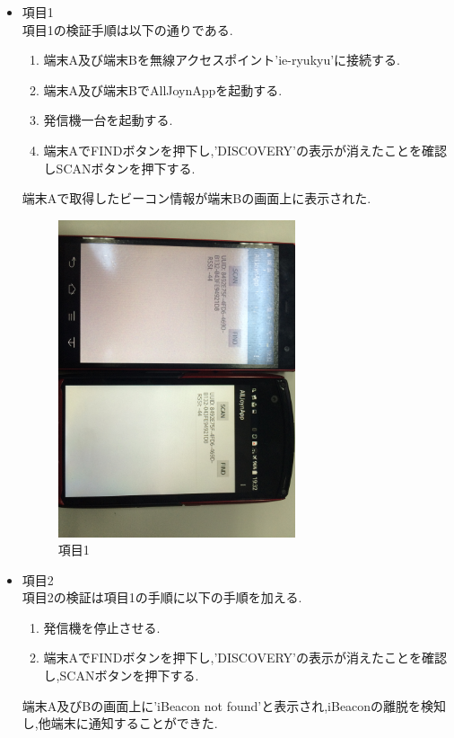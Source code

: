 \begin{itemize}
\item 項目1 \\
  項目1の検証手順は以下の通りである.
  \begin{enumerate}
  \item 端末A及び端末Bを無線アクセスポイント'ie-ryukyu'に接続する.
  \item 端末A及び端末BでAllJoynAppを起動する.
  \item 発信機一台を起動する.
  \item 端末AでFINDボタンを押下し,'DISCOVERY'の表示が消えたことを確認しSCANボタンを押下する.
  \end{enumerate}

  端末Aで取得したビーコン情報が端末Bの画面上に表示された.

  \begin{figure}[htbp]
    \centering
    \includegraphics[width=7cm]{fig/ins_1.jpg}
    \caption{項目1}
  \end{figure}


  \newpage
  
\item 項目2 \\
  項目2の検証は項目1の手順に以下の手順を加える.
  \begin{enumerate}
  \item 発信機を停止させる.
  \item 端末AでFINDボタンを押下し,'DISCOVERY'の表示が消えたことを確認し,SCANボタンを押下する.
  \end{enumerate}

  端末A及びBの画面上に'iBeacon not found'と表示され,iBeaconの離脱を検知し,他端末に通知することができた.


\end{itemize}
